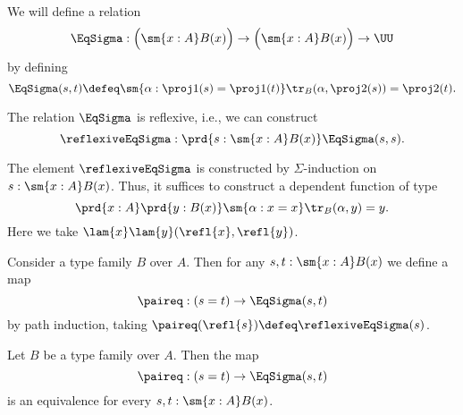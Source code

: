 \begin{defn}
  We will define a relation
  \begin{equation*}
    \EqSigma : \Big(\sm{x:A}B(x)\Big)\to\Big(\sm{x:A}B(x)\Big)\to\UU
  \end{equation*}
  by defining
  \begin{equation*}
    \EqSigma(s,t)\defeq\sm{\alpha:\proj 1(s)=\proj 1(t)}\tr_B(\alpha,\proj 2(s))=\proj 2 (t).
  \end{equation*}
\end{defn}

\begin{lem}
  The relation $\EqSigma$ is reflexive, i.e., we can construct
  \begin{equation*}
    \reflexiveEqSigma:\prd{s:\sm{x:A}B(x)}\EqSigma(s,s).
  \end{equation*}
\end{lem}

\begin{constr}
  The element $\reflexiveEqSigma$ is constructed by $\Sigma$-induction on $s:\sm{x:A}B(x)$. Thus, it suffices to construct a dependent function of type
  \begin{equation*}
    \prd{x:A}\prd{y:B(x)}\sm{\alpha:x=x}\tr_B(\alpha,y)=y.
  \end{equation*}
  Here we take $\lam{x}\lam{y}(\refl{x},\refl{y})$.
\end{constr}

\begin{defn}
  Consider a type family $B$ over $A$. Then for any $s,t:\sm{x:A}B(x)$ we define a map
  \begin{equation*}
    \paireq: (s=t)\to \EqSigma(s,t)
  \end{equation*}
  by path induction, taking $\paireq(\refl{s})\defeq\reflexiveEqSigma(s)$.
\end{defn}

\begin{thm}\label{thm:eq_sigma}
  Let $B$ be a type family over $A$. Then the map
  \begin{equation*}
    \paireq: (s=t)\to \EqSigma(s,t)
  \end{equation*}
  is an equivalence for every $s,t:\sm{x:A}B(x)$.
\end{thm}

